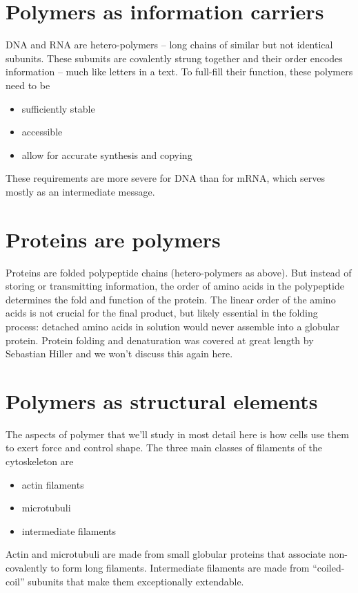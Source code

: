 \section{Polymers as information carriers}
DNA and RNA are hetero-polymers -- long chains of similar but not identical subunits.
These subunits are covalently strung together and their order encodes information -- much like letters in a text.
To full-fill their function, these polymers need to be
\begin{itemize}
	\item sufficiently stable
	\item accessible
	\item allow for accurate synthesis and copying
\end{itemize}
These requirements are more severe for DNA than for mRNA, which serves mostly as an intermediate message.

\section{Proteins are polymers}
Proteins are folded polypeptide chains (hetero-polymers as above).
But instead of storing or transmitting information, the order of amino acids in the polypeptide determines the fold and function of the protein.
The linear order of the amino acids is not crucial for the final product, but likely essential in the folding process: detached amino acids in solution would never assemble into a globular protein.
Protein folding and denaturation was covered at great length by Sebastian Hiller and we won't discuss this again here.

\section{Polymers as structural elements}
The aspects of polymer that we'll study in most detail here is how cells use them to exert force and control shape.
The three main classes of filaments of the cytoskeleton are
\begin{itemize}
	\item actin filaments
	\item microtubuli
	\item intermediate filaments
\end{itemize}
Actin and microtubuli are made from small globular proteins that associate non-covalently to form long filaments.
Intermediate filaments are made from ``coiled-coil'' subunits that make them exceptionally extendable.

